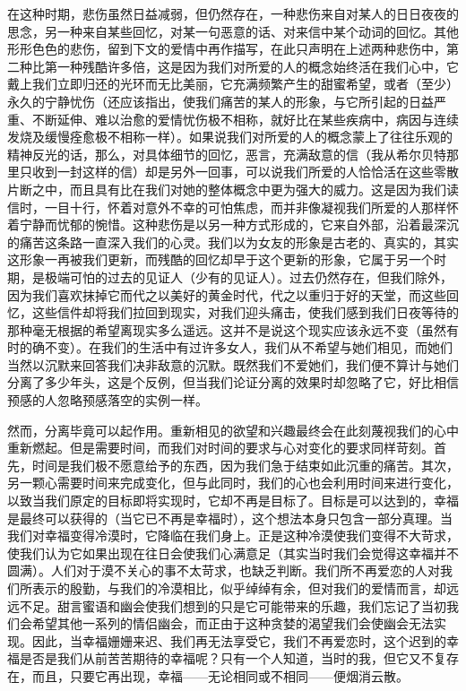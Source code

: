 \par 在这种时期，悲伤虽然日益减弱，但仍然存在，一种悲伤来自对某人的日日夜夜的思念，另一种来自某些回忆，对某一句恶意的话、对来信中某个动词的回忆。其他形形色色的悲伤，留到下文的爱情中再作描写，在此只声明在上述两种悲伤中，第二种比第一种残酷许多倍，这是因为我们对所爱的人的概念始终活在我们心中，它戴上我们立即归还的光环而无比美丽，它充满频繁产生的甜蜜希望，或者（至少）永久的宁静忧伤（还应该指出，使我们痛苦的某人的形象，与它所引起的日益严重、不断延伸、难以治愈的爱情忧伤极不相称，就好比在某些疾病中，病因与连续发烧及缓慢痊愈极不相称一样）。如果说我们对所爱的人的概念蒙上了往往乐观的精神反光的话，那么，对具体细节的回忆，恶言，充满敌意的信（我从希尔贝特那里只收到一封这样的信）却是另外一回事，可以说我们所爱的人恰恰活在这些零散片断之中，而且具有比在我们对她的整体概念中更为强大的威力。这是因为我们读信时，一目十行，怀着对意外不幸的可怕焦虑，而并非像凝视我们所爱的人那样怀着宁静而忧郁的惋惜。这种悲伤是以另一种方式形成的，它来自外部，沿着最深沉的痛苦这条路一直深入我们的心灵。我们以为女友的形象是古老的、真实的，其实这形象一再被我们更新，而残酷的回忆却早于这个更新的形象，它属于另一个时期，是极端可怕的过去的见证人（少有的见证人）。过去仍然存在，但我们除外，因为我们喜欢抹掉它而代之以美好的黄金时代，代之以重归于好的天堂，而这些回忆，这些信件却将我们拉回到现实，对我们迎头痛击，使我们感到我们日夜等待的那种毫无根据的希望离现实多么遥远。这并不是说这个现实应该永远不变（虽然有时的确不变）。在我们的生活中有过许多女人，我们从不希望与她们相见，而她们当然以沉默来回答我们决非敌意的沉默。既然我们不爱她们，我们便不算计与她们分离了多少年头，这是个反例，但当我们论证分离的效果时却忽略了它，好比相信预感的人忽略预感落空的实例一样。
\par 然而，分离毕竟可以起作用。重新相见的欲望和兴趣最终会在此刻蔑视我们的心中重新燃起。但是需要时间，而我们对时间的要求与心对变化的要求同样苛刻。首先，时间是我们极不愿意给予的东西，因为我们急于结束如此沉重的痛苦。其次，另一颗心需要时间来完成变化，但与此同时，我们的心也会利用时间来进行变化，以致当我们原定的目标即将实现时，它却不再是目标了。目标是可以达到的，幸福是最终可以获得的（当它已不再是幸福时），这个想法本身只包含一部分真理。当我们对幸福变得冷漠时，它降临在我们身上。正是这种冷漠使我们变得不大苛求，使我们认为它如果出现在往日会使我们心满意足（其实当时我们会觉得这幸福并不圆满）。人们对于漠不关心的事不太苛求，也缺乏判断。我们所不再爱恋的人对我们所表示的殷勤，与我们的冷漠相比，似乎绰绰有余，但对我们的爱情而言，却远远不足。甜言蜜语和幽会使我们想到的只是它可能带来的乐趣，我们忘记了当初我们会希望其他一系列的情侣幽会，而正由于这种贪婪的渴望我们会使幽会无法实现。因此，当幸福姗姗来迟、我们再无法享受它，我们不再爱恋时，这个迟到的幸福是否是我们从前苦苦期待的幸福呢？只有一个人知道，当时的我，但它又不复存在，而且，只要它再出现，幸福——无论相同或不相同——便烟消云散。
